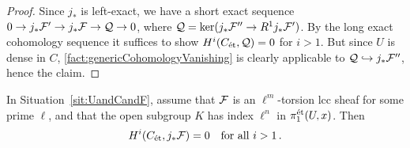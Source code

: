 \begin{proof}
	Since $j_*$ is left-exact, we have a short exact sequence $0\morphism j_*\Ff'\morphism j_*\Ff\morphism \Qq\morphism 0$, where $\Qq=\ker(j_*\Ff''\morphism R^1j_*\Ff')$. By the long exact cohomology sequence it suffices to show $H^i(C_{\mathrm{\acute{e}t}},\mathcal{Q})=0$ for $i>1$. But since $U$ is dense in $C$, \cref{fact:genericCohomologyVanishing} is clearly applicable to $\Qq\monomorphism j_*\Ff''$, hence the claim.
\end{proof}
\begin{lem}\label{lem:indexl^n}
	In Situation~\cref{sit:UandCandF}, assume that $\mathcal{F}$ is an $\ell^m$-torsion lcc sheaf for some prime $\ell$, and that the open subgroup $K$ has index $\ell^n$ in $\pi_1^{\mathrm{\acute{e}t}}(U,x)$. Then
	\begin{equation*}
		H^i(C_{\mathrm{\acute{e}t}},j_*\mathcal{F})=0\quad\text{for all }i>1\,.
	\end{equation*}
\end{lem}
